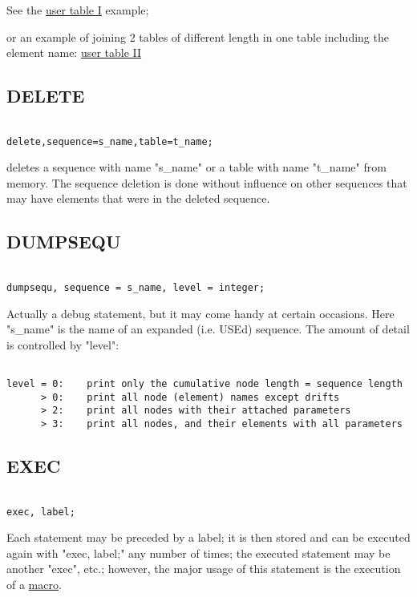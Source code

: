 See the \href{../Introduction/select.html#ucreate}{user table I}
example;  

or an example of joining 2 tables of different length in one table
including the element name:
\href{../Introduction/select.html#screate}{user table II} 




\subsection{DELETE}
\begin{verbatim}

delete,sequence=s_name,table=t_name;
\end{verbatim} 
deletes a sequence with name "s\_name" or a table with name "t\_name"
from memory. The sequence deletion is done without influence on other
sequences that may have elements that were in the deleted sequence.  


\subsection{DUMPSEQU}
\begin{verbatim}

dumpsequ, sequence = s_name, level = integer;
\end{verbatim} 
Actually a debug statement, but it may come handy at certain
occasions. Here "s\_name" is the name of an expanded (i.e. USEd)
sequence. The amount of detail is controlled by "level":  
\begin{verbatim}

level = 0:    print only the cumulative node length = sequence length
      > 0:    print all node (element) names except drifts
      > 2:    print all nodes with their attached parameters
      > 3:    print all nodes, and their elements with all parameters
\end{verbatim}


\subsection{EXEC}
\begin{verbatim}

exec, label;
\end{verbatim} 
Each statement may be preceded by a label; it is then stored and can be
executed again with "exec, label;" any number of times; the executed
statement may be another "exec", etc.; however, the major usage of this
statement is the execution of a \href{special.html#macro}{macro}.  


